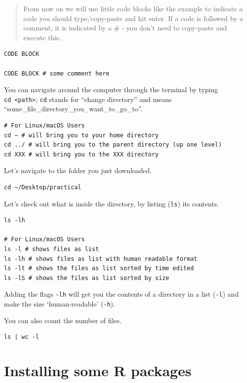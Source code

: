 \documentclass[
]{book}
\begin{document}
\begin{quote}
From now on we will use little code blocks like the example to indicate a code you should type/copy-paste and hit enter. If a code is followed by a comment, it is indicated by a \# - you don't need to copy-paste and execute this.
\end{quote}

\begin{verbatim}
CODE BLOCK

CODE BLOCK # some comment here
\end{verbatim}

You can navigate around the computer through the terminal by typing \texttt{cd\ \textless{}path\textgreater{}}; \texttt{cd} stands for ``change directory'' and means ``some\_file\_directory\_you\_want\_to\_go\_to''.

\begin{verbatim}
# For Linux/macOS Users
cd ~ # will bring you to your home directory
cd ../ # will bring you to the parent directory (up one level) 
cd XXX # will bring you to the XXX directory
\end{verbatim}

Let's navigate to the folder you just downloaded.

\begin{verbatim}
cd ~/Desktop/practical
\end{verbatim}

Let's check out what is inside the directory, by listing (\texttt{ls}) its contents.

\begin{verbatim}
ls -lh

# For Linux/macOS Users
ls -l # shows files as list
ls -lh # shows files as list with human readable format 
ls -lt # shows the files as list sorted by time edited
ls -lS # shows the files as list sorted by size
\end{verbatim}

Adding the flags \texttt{-lh} will get you the contents of a directory in a list (\texttt{-l}) and make the size `human-readable' (\texttt{-h}).

You can also count the number of files.

\begin{verbatim}
ls | wc -l
\end{verbatim}

\hypertarget{installing-some-r-packages}{%
\section{Installing some R packages}\label{installing-some-r-packages}}
\end{document}
